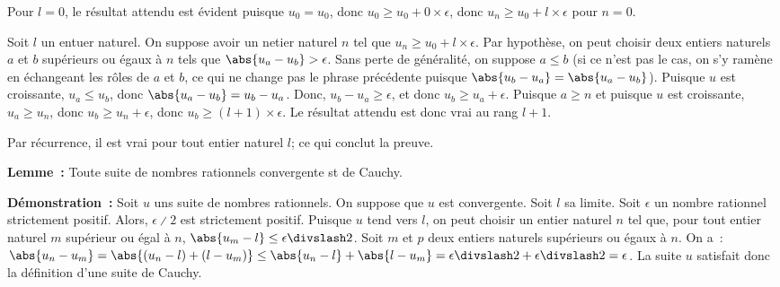     Pour $l = 0$, le résultat attendu est évident puisque $u_0 = u_0$, donc $u_0 \geq u_0 + 0 \times \epsilon$, donc $u_n \geq u_0 + l \times \epsilon$ pour $n = 0$.

    Soit $l$ un entuer naturel. 
    On suppose avoir un netier naturel $n$ tel que $u_n \geq u_0 + l \times \epsilon$.
    Par hypothèse, on peut choisir deux entiers naturels $a$ et $b$ supérieurs ou égaux à $n$ tels que $\abs{u_a - u_b} > \epsilon$.
    Sans perte de généralité, on suppose $a \leq b$ (si ce n'est pas le cas, on s'y ramène en échangeant les rôles de $a$ et $b$, ce qui ne change pas le phrase précédente puisque $\abs{u_b - u_a} = \abs{u_a - u_b}$).
    Puisque $u$ est croissante, $u_a \leq u_b$, donc $\abs{u_a - u_b} = u_b - u_a$.
    Donc, $u_b - u_a \geq \epsilon$, et donc $u_b \geq u_a + \epsilon$.
    Puisque $a \geq n$ et puisque $u$ est croissante, $u_a \geq u_n$, donc $u_b \geq u_n + \epsilon$, donc $u_b \geq (l+1) \times \epsilon$.
    Le résultat attendu est donc vrai au rang $l+1$. 

    Par récurrence, il est vrai pour tout entier naturel $l$; ce qui conclut la preuve.

    \done

\medskip

\noindent\textbf{Lemme :} Toute suite de nombres rationnels convergente st de Cauchy. 

\medskip

\noindent\textbf{Démonstration :} Soit $u$ uns suite de nombres rationnels.
    On suppose que $u$ est convergente. 
    Soit $l$ sa limite. 
    Soit $\epsilon$ un nombre rationnel strictement positif. 
    Alors, $\epsilon \divslash 2$ est strictement positif.
    Puisque $u$ tend vers $l$, on peut choisir un entier naturel $n$ tel que, pour tout entier naturel $m$ supérieur ou égal à $n$, $\abs{u_m - l} \leq \epsilon \divslash 2$. 
    Soit $m$ et $p$ deux entiers naturels supérieurs ou égaux à $n$. 
    On a : $\abs{u_n - u_m} = \abs{(u_n - l) + (l - u_m)} \leq \abs{u_n - l} + \abs{l - u_m} = \epsilon \divslash 2 + \epsilon \divslash 2 = \epsilon$. 
    La suite $u$ satisfait donc la définition d'une suite de Cauchy. 

    \done

\medskip

